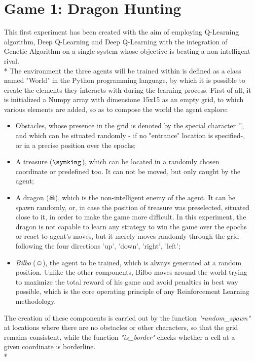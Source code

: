 \section{Game 1: Dragon Hunting}
This first experiment has been created with the aim of employing Q-Learning algorithm, Deep Q-Learning and Deep Q-Learning with the integration of Genetic Algorithm on a single system whose objective is beating a non-intelligent rival.\\*
The environment the three agents will be trained within is defined as a class named "World" in the Python programming language, by which it is possible to create the elements they interacts with during the learning process. First of all, it is initialized a Numpy array with dimensione 15x15 as an empty grid, to which various elements are added, so as to compose the world the agent explore:
\begin{itemize}
  \item Obstacles, whose presence in the grid is denoted by the special character '', and which can be situated randomly - if no "entrance" location is specified-, or in a precise position over the epochs;
  \item A treasure ($\symking$), which can be located in a randomly chosen coordinate or predefined too. It can not be moved, but only caught by the agent;
  \item A dragon ($\skull$), which is the non-intelligent enemy of the agent. It can be spawn randomly, or, in case the position of treasure was preselected, situated close to it, in order to make the game more difficult. In this experiment, the dragon is not capable to learn any strategy to win the game over the epochs or react to agent's moves, but it merely moves randomly through the grid following the four directions 'up', 'down', 'right', 'left';
  \item \textit{Bilbo} ($\smiley$), the agent to be trained, which is always generated at a random position. Unlike the other components, Bilbo moves around the world trying to maximize the total reward of his game and avoid penalties in best way possible, which is the core operating principle of any Reinforcement Learning methodology.
\end{itemize}
The creation of these components is carried out by the function \textit{"random\_spawn"} at locations where there are no obstacles or other characters, so that the grid remains consistent, while the function \textit{"is\_border"} checks whether a cell at a given coordinate is borderline.\\*
